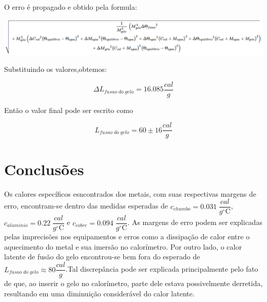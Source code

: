 \documentclass[12pt,a4paper]{article}
\begin{document}
O erro é propagado e obtido pela formula: 

\includegraphics[scale=0.45]{formula2.png}

Substituindo os valores,obtemos:

$$ \Delta L_{fusao\;do\;gelo} = 16.085 \dfrac{cal}{g}$$

Então o valor final pode ser escrito como

$$ L_{fusao\;do\;gelo} = 60 \pm 16 \dfrac{cal}{g}$$


\section{Conclusões}
Os calores específicos esncontrados dos metais, com suas respectivas margens de erro, encontram-se dentro das medidas esperadas de $ c_{chumbo} = 0.031 \; \dfrac{cal}{g^{\circ}\mathrm{C}}$, $ c_{aluminio} = 0.22  \; \dfrac{cal}{g^{\circ}\mathrm{C}}$ e $ c_{cobre} = 0.094\; \dfrac{cal}{g^{\circ}\mathrm{C}}$. As margens de erro podem ser explicadas pelas imprecisões nos equipamentos e erros como a dissipação de calor entre o aquecimento do metal e sua imersão no calorímetro.
Por outro lado, o calor latente de fusão do gelo encontrou-se bem fora do esperado de $ L_{fusao\;do\;gelo} \approx 80 \dfrac{cal}{g}$.Tal discrepância pode ser explicada principalmente pelo fato de que, ao inserir o gelo no calorímetro, parte dele estava possivelmente derretida, resultando em uma diminuição considerável do calor latente.
\end{document}
